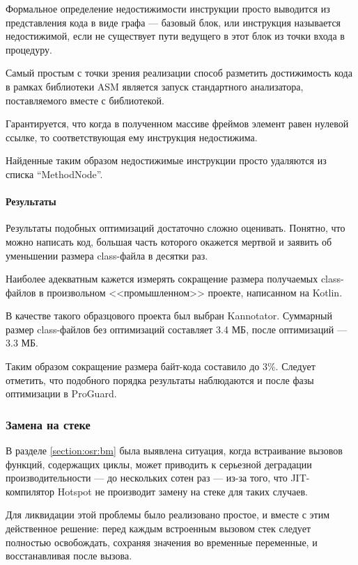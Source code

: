 Формальное определение недостижимости инструкции просто выводится из представления кода в виде
графа --- базовый блок, или инструкция называется недостижимой, если не существует пути
ведущего в этот блок из точки входа в процедуру.

Самый простым с точки зрения реализации способ разметить достижимость кода в рамках библиотеки ASM
является запуск стандартного анализатора, поставляемого вместе с библиотекой.

Гарантируется, что когда в полученном массиве фреймов элемент равен нулевой ссылке, то
соответствующая ему инструкция недостижима.

Найденные таким образом недостижимые инструкции просто удаляются из списка ``MethodNode''.

\paragraph{Результаты}
Результаты подобных оптимизаций достаточно сложно оценивать.
Понятно, что можно написать код, большая часть которого окажется мертвой и заявить об уменьшении
размера class-файла в десятки раз.

Наиболее адекватным кажется измерять сокращение размера получаемых class-файлов в произвольном
<<промышленном>> проекте, написанном на Kotlin.

В качестве такого образцового проекта был выбран Kannotator.
Суммарный размер class-файлов без оптимизаций составляет 3.4 МБ, после оптимизаций --- 3.3 МБ.

Таким образом сокращение размера байт-кода составило до 3\%.
Следует отметить, что подобного порядка результаты наблюдаются и после фазы оптимизации
в ProGuard.

\subsubsection{Замена на стеке}
В разделе \ref{section:osr:bm} была выявлена ситуация, когда встраивание вызовов функций, содержащих
циклы, может приводить к серьезной деградации производительности --- до нескольких сотен раз ---
из-за того, что JIT-компилятор Hotspot не производит замену на стеке для таких случаев.

Для ликвидации этой проблемы было реализовано простое, и вместе с этим действенное решение:
перед каждым встроенным вызовом стек следует полностью освобождать, сохраняя значения во временные
переменные, и восстанавливая после вызова.

